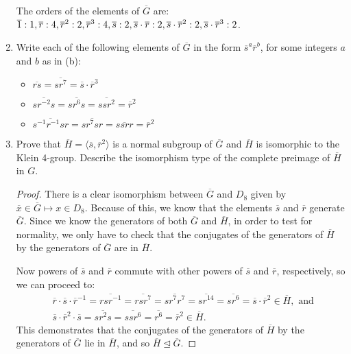 \documentclass{article}
\begin{document}
\begin{enumerate}[label=(\alph*), itemsep=0em]
          The orders of the elements of $\overline{G}$ are: $\overline{1}: 1, \overline{r}: 4, \overline{r}^2: 2, \overline{r}^3: 4, \overline{s}: 2, \\ \overline{s}\cdot\overline{r}: 2, \overline{s}\cdot\overline{r}^2: 2, \overline{s}\cdot\overline{r}^3: 2$.
    \item Write each of the following elements of $\overline{G}$ in the form $\overline{s}^a \overline{r}^b$, for some integers $a$ and $b$ as in (b):
        \begin{itemize}[itemsep=0em]
            \item $\overline{rs} = \overline{sr^7} = \overline{s}\cdot\overline{r}^3$
            \item $\overline{sr^{-2}s} = \overline{sr^6 s} = \overline{ssr^2} = \overline{r}^2$
            \item $\overline{s^{-1}r^{-1}sr} = \overline{sr^7sr} = \overline{ssrr} = \overline{r}^2$
        \end{itemize}
    \item Prove that $\overline{H} = \langle \overline{s}, \overline{r}^2 \rangle$ is a normal subgroup of $\overline{G}$ and $\overline{H}$ is isomorphic to the Klein 4-group. Describe the isomorphism type of the complete preimage of $\overline{H}$ in $G$.
          \begin{proof}
            There is a clear isomorphism between $\overline{G}$ and $D_8$ given by $\overline{x} \in \overline{G} \mapsto x \in D_8$. Because of this, we know that the elements $\overline{s}$ and $\overline{r}$ generate $\overline{G}$. Since we know the generators of both $\overline{G}$ and $\overline{H}$, in order to test for normality, we only have to check that the conjugates of the generators of $\overline{H}$ by the generators of $\overline{G}$ are in $\overline{H}$.

            Now powers of $\overline{s}$ and $\overline{r}$ commute with other powers of $\overline{s}$ and $\overline{r}$, respectively, so we can proceed to:
            \begin{align*}
                &\overline{r}\cdot\overline{s}\cdot\overline{r}^{-1} = \overline{rsr^{-1}} = \overline{rsr^7} = \overline{sr^7r^7} = \overline{sr^{14}} = \overline{sr^{6}} = \overline{s}\cdot\overline{r}^2 \in \overline{H}, \text{ and } \\
                &\overline{s}\cdot\overline{r}^2\cdot\overline{s} = \overline{sr^2 s} = \overline{ssr^6} = \overline{r^6} = \overline{r}^2 \in \overline{H}.
            \end{align*}
            This demonstrates that the conjugates of the generators of $\overline{H}$ by the generators of $\overline{G}$ lie in $\overline{H}$, and so $\overline{H} \unlhd \overline{G}$.


\end{proof}
\end{enumerate}
\end{document}

